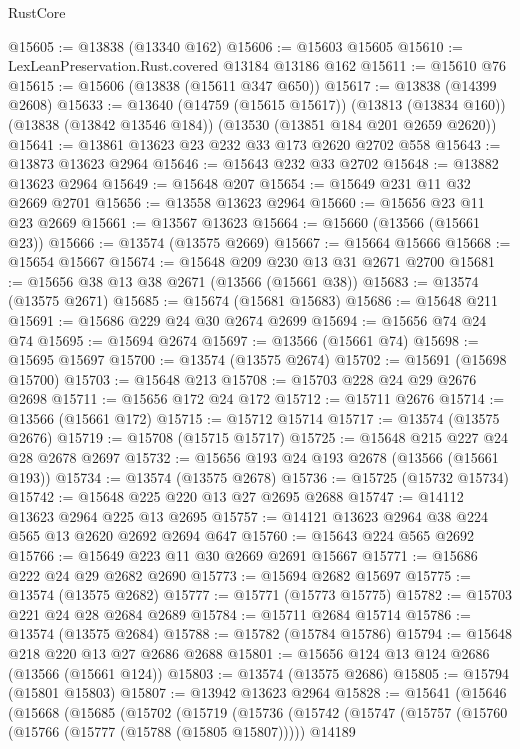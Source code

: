 \begin{lexlean}{RustCore}
\begin{coremodule}
@15605 := @13838 (@13340 @162)
@15606 := @15603 @15605
@15610 := LexLeanPreservation.Rust.covered @13184 @13186 @162
@15611 := @15610 @76
@15615 := @15606 (@13838 (@15611 @347 @650))
@15617 := @13838 (@14399 @2608)
@15633 := @13640
    (@14759 (@15615 @15617))
    (@13813 (@13834 @160))
    (@13838 (@13842 @13546 @184))
    (@13530 (@13851 @184 @201 @2659 @2620))
@15641 := @13861 @13623 @23 @232 @33 @173 @2620 @2702 @558
@15643 := @13873 @13623 @2964
@15646 := @15643 @232 @33 @2702
@15648 := @13882 @13623 @2964
@15649 := @15648 @207
@15654 := @15649 @231 @11 @32 @2669 @2701
@15656 := @13558 @13623 @2964
@15660 := @15656 @23 @11 @23 @2669
@15661 := @13567 @13623
@15664 := @15660 (@13566 (@15661 @23))
@15666 := @13574 (@13575 @2669)
@15667 := @15664 @15666
@15668 := @15654 @15667
@15674 := @15648 @209 @230 @13 @31 @2671 @2700
@15681 := @15656 @38 @13 @38 @2671 (@13566 (@15661 @38))
@15683 := @13574 (@13575 @2671)
@15685 := @15674 (@15681 @15683)
@15686 := @15648 @211
@15691 := @15686 @229 @24 @30 @2674 @2699
@15694 := @15656 @74 @24 @74
@15695 := @15694 @2674
@15697 := @13566 (@15661 @74)
@15698 := @15695 @15697
@15700 := @13574 (@13575 @2674)
@15702 := @15691 (@15698 @15700)
@15703 := @15648 @213
@15708 := @15703 @228 @24 @29 @2676 @2698
@15711 := @15656 @172 @24 @172
@15712 := @15711 @2676
@15714 := @13566 (@15661 @172)
@15715 := @15712 @15714
@15717 := @13574 (@13575 @2676)
@15719 := @15708 (@15715 @15717)
@15725 := @15648 @215 @227 @24 @28 @2678 @2697
@15732 := @15656 @193 @24 @193 @2678 (@13566 (@15661 @193))
@15734 := @13574 (@13575 @2678)
@15736 := @15725 (@15732 @15734)
@15742 := @15648 @225 @220 @13 @27 @2695 @2688
@15747 := @14112 @13623 @2964 @225 @13 @2695
@15757 := @14121 @13623 @2964 @38 @224 @565 @13 @2620 @2692 @2694 @647
@15760 := @15643 @224 @565 @2692
@15766 := @15649 @223 @11 @30 @2669 @2691 @15667
@15771 := @15686 @222 @24 @29 @2682 @2690
@15773 := @15694 @2682 @15697
@15775 := @13574 (@13575 @2682)
@15777 := @15771 (@15773 @15775)
@15782 := @15703 @221 @24 @28 @2684 @2689
@15784 := @15711 @2684 @15714
@15786 := @13574 (@13575 @2684)
@15788 := @15782 (@15784 @15786)
@15794 := @15648 @218 @220 @13 @27 @2686 @2688
@15801 := @15656 @124 @13 @124 @2686 (@13566 (@15661 @124))
@15803 := @13574 (@13575 @2686)
@15805 := @15794 (@15801 @15803)
@15807 := @13942 @13623 @2964
@15828 := @15641
    (@15646
      (@15668
        (@15685
          (@15702
            (@15719
              (@15736
                (@15742
                  (@15747
                    (@15757
                      (@15760 (@15766 (@15777 (@15788 (@15805 @15807)))))
                      @14189

\end{coremodule}
\end{lexlean}
